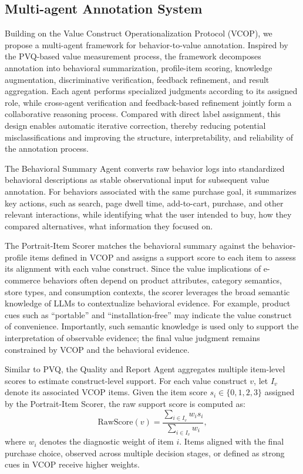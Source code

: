 \documentclass[11pt]{article}
\begin{document}
\subsection{Multi-agent Annotation System}
Building on the Value Construct Operationalization Protocol (VCOP), we propose a multi-agent framework for behavior-to-value annotation. Inspired by the PVQ-based value measurement process, the framework decomposes annotation into behavioral summarization, profile-item scoring, knowledge augmentation, discriminative verification, feedback refinement, and result aggregation. Each agent performs specialized judgments according to its assigned role, while cross-agent verification and feedback-based refinement jointly form a collaborative reasoning process. Compared with direct label assignment, this design enables automatic iterative correction, thereby reducing potential misclassifications and improving the structure, interpretability, and reliability of the annotation process.

The Behavioral Summary Agent converts raw behavior logs into standardized behavioral descriptions as stable observational input for subsequent value annotation. For behaviors associated with the same purchase goal, it summarizes key actions, such as search, page dwell time, add-to-cart, purchase, and other relevant interactions, while identifying what the user intended to buy, how they compared alternatives, what information they focused on.

The Portrait-Item Scorer matches the behavioral summary against the behavior-profile items defined in VCOP and assigns a support score to each item to assess its alignment with each value construct. Since the value implications of e-commerce behaviors often depend on product attributes, category semantics, store types, and consumption contexts, the scorer leverages the broad semantic knowledge of LLMs to contextualize behavioral evidence. For example, product cues such as “portable” and “installation-free” may indicate the value construct of convenience. Importantly, such semantic knowledge is used only to support the interpretation of observable evidence; the final value judgment remains constrained by VCOP and the behavioral evidence.

Similar to PVQ, the Quality and Report Agent aggregates multiple item-level scores to estimate construct-level support. For each value construct \(v\), let \(I_v\) denote its associated VCOP items. Given the item score \(s_i \in \{0,1,2,3\}\) assigned by the Portrait-Item Scorer, the raw support score is computed as:
\[
\mathrm{RawScore}(v)=\frac{\sum_{i \in I_v} w_i s_i}{\sum_{i \in I_v} w_i},
\]
where \(w_i\) denotes the diagnostic weight of item \(i\). Items aligned with the final purchase choice, observed across multiple decision stages, or defined as strong cues in VCOP receive higher weights.
\end{document}
